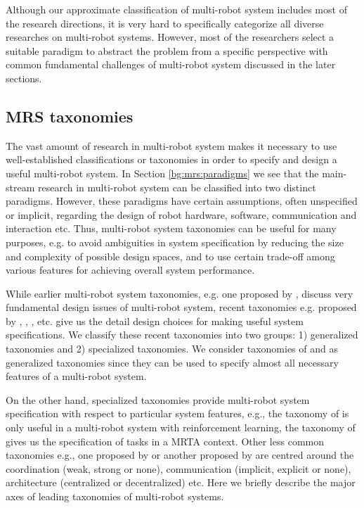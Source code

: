 Although our approximate classification of multi-robot system includes most of the research directions, it is very hard to specifically categorize all diverse researches on multi-robot systems. However, most of the researchers select a suitable paradigm to abstract the problem from a specific perspective with common fundamental challenges of multi-robot system discussed in the later sections.
\subsection{MRS taxonomies}
\label{bg:mrs:taxonomies}
The vast amount of research in multi-robot system makes it necessary to use well-established classifications or taxonomies in order to specify and design a useful multi-robot system. In Section \ref{bg:mrs:paradigms} we see that the main-stream research in multi-robot system can be classified into two distinct paradigms. However, these paradigms have certain assumptions, often unspecified or implicit, regarding the design of robot hardware, software, communication and interaction etc. Thus, multi-robot system taxonomies can be useful for many purposes, e.g. to avoid ambiguities in system specification by reducing the size and complexity of possible design spaces, and to use certain trade-off among various features for achieving overall system performance.

While earlier multi-robot system taxonomies, e.g. one proposed by ,  discuss very fundamental design issues of multi-robot system, recent taxonomies e.g. proposed by , , ,  etc. give us the detail design choices for making useful system specifications. We classify these recent taxonomies into two groups: 1) generalized taxonomies and 2) specialized taxonomies. We consider taxonomies of  and  as generalized taxonomies since they  can be used to specify almost all necessary features of a multi-robot system.   

On the other hand, specialized taxonomies provide multi-robot system specification with respect to particular system features, e.g., the taxonomy of  is only useful in a multi-robot system with reinforcement learning, the taxonomy of  gives us the specification of tasks in a MRTA context. Other less common taxonomies e.g., one proposed by  or another proposed by  are centred around the coordination (weak, strong or none), communication (implicit, explicit or none), architecture (centralized or decentralized) etc. Here we briefly describe the major axes of leading taxonomies of multi-robot systems.
